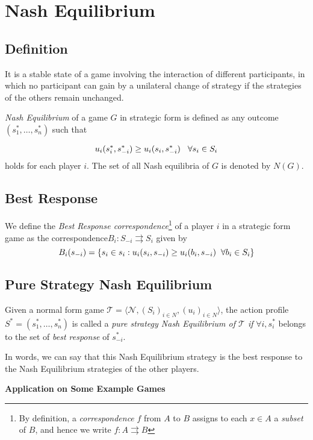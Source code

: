 \section {Nash Equilibrium}

\subsection{Definition}
It is a stable state of a game involving the interaction of different participants, in which no participant can gain by a unilateral change of strategy if the strategies of the others remain unchanged. \\

\begin{flushleft}\textit{Nash Equilibrium} of a game $G$ in strategic form is defined as any outcome $(s^*_1, \dots , s^*_n)$ such that \end{flushleft}$$u_i(s^*_i, s^*_{-i}) \geq u_i(s_i, s^*_{-i})\hspace{0.3cm} \forall s_i \in S_i$$ holds for each player $i$. The set of all Nash equilibria of $G$ is denoted by $N(G)$.

\subsection{Best Response}
We define the \textit{Best Response correspondence}\footnote{By definition, a \textit{correspondence} $f$ from $A$ to $B$ assigns to each $x \in A$ a \textit{subset} of $B$, and hence we write $f: A \rightrightarrows B$} of a player $i$ in a strategic form game as the correspondence$B_i : S_{-i} \rightrightarrows S_i$ given by $$B_i(s_{-i}) = \{s_i \in s_i: u_i(s_i, s_{-i}) \geq u_i(b_i, s_{-i})\hspace{0.2cm} \forall b_i \in S_i\} $$

\subsection{Pure Strategy Nash Equilibrium}
Given a normal form game $\mathcal{T} = \langle \mathcal{N}, (S_i)_{i \in N}, (u_i)_{i \in N}\rangle$, the action profile $S^* = (s^*_1, \dots , s^*_n)$ is called a \textit{pure strategy Nash Equilibrium of $\mathcal{T}$ if} $\forall i, s^*_i$ belongs to the set of \textit{best response } of $s^*_{-i}$.

\begin{flushleft}In words, we can say that this Nash Equilibrium strategy is the best response to the Nash Equilibrium strategies of the other players. \newline

\begin{large}\textbf{Application on Some Example Games}\end{large}\end{flushleft}


